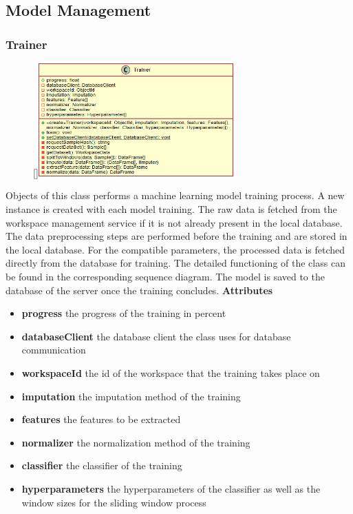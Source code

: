 \newpage
\subsection{Model Management}

\subsubsection{Trainer}
\label{Trainer}
\begin{figure}
    \raisebox{0pt}[\dimexpr{}\baselineskip\relax]{\includegraphics[width=7.5cm]{classes/model-management/1.png}}
\end{figure} 
\par
Objects of this class performs a machine learning model training process. A new instance is created with each model training. The raw data is fetched from the workspace management service if it is not already present in the local database. The data preprocessing steps are performed before the training and are stored in the local database. For the compatible parameters, the processed data is fetched directly from the database for training. The detailed functioning of the class can be found in the corresponding sequence diagram. The model is saved to the database of the server once the training concludes.
\newline
\newline
\textbf{Attributes}
\begin{itemize}
    \item \textbf{progress} the progress of the training in percent
    \item \textbf{databaseClient} the database client the class uses for database communication
    \item \textbf{workspaceId} the id of the workspace that the training takes place on
    \item \textbf{imputation} the imputation method of the training
    \item \textbf{features} the features to be extracted
    \item \textbf{normalizer} the normalization method of the training
    \item \textbf{classifier} the classifier of the training
    \item \textbf{hyperparameters} the hyperparameters of the classifier as well as the window sizes for the sliding window process
\end{itemize}
